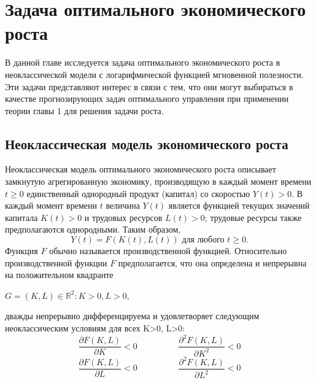 \chapter{Задача оптимального экономического роста}\label{chap2}


В данной главе исследуется задача оптимального экономического роста в неоклассической модели с логарифмической функцией мгновенной полезности.  Эти задачи представляют интерес в связи с тем, что они могут выбираться в качестве прогнозирующих задач оптимального управления при применении теории главы 1 для решения задачи роста.

\section{Неоклассическая модель экономического роста}\label{2sec:problem-formulation}
Неоклассическая модель оптимального экономического роста описывает замкнутую агрегированную экономику, производящую в каждый момент времени $ t \ge 0$ 
единственный однородный продукт (капитал) со скоростью $ Y(t)>0 $. В каждый момент времени $ t $ величина $ Y (t) $ является функцией текущих значений капитала $ K(t) > 0 $ и трудовых ресурсов $ L(t) > 0 $; трудовые ресурсы также предполагаются однородными. Таким образом, \\
\begin{equation}
Y (t)=F(K(t),L(t)) \text{ для любого } t \ge 0. 
\end{equation}
Функция $ F $ обычно называется производственной функцией. Относительно производственной функции $ F $ предполагается, что она определена и непрерывна на положительном квадранте \\
\begin{center}
	$G ={(K,L) \in \mathbb{R}^2: K>0, L >0},$
\end{center}
дважды непрерывно дифференцируема и удовлетворяет следующим неоклассическим условиям 
для всех K>0, L>0: \\
\begin{equation}
\dfrac{\partial F (K, L)}{\partial K} < 0 \hspace{2cm}  \dfrac{\partial^2 F (K, L)}{\partial K^2} < 0
\end{equation}
\begin{equation}
\dfrac{\partial F (K, L)}{\partial L} < 0 \hspace{2cm}  \dfrac{\partial^2 F (K, L)}{\partial L^2} < 0
\end{equation}\\
